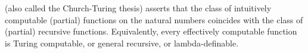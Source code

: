  (also called the Church-Turing thesis) asserts that the class of intuitively computable (partial) functions on the natural numbers coincides with the class of (partial) recursive functions. Equivalently, every effectively computable function is Turing computable, or general recursive, or lambda-definable.
